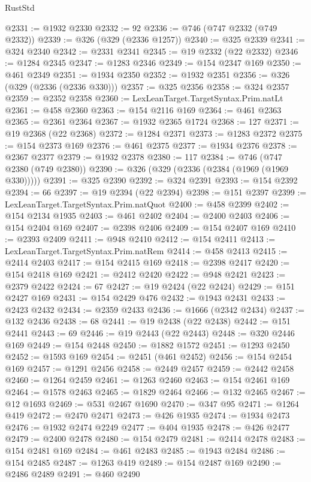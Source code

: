 \begin{lexlean}{RustStd}
\begin{coremodule}
@2331 := @1932 @2330
@2332 := 92
@2336 := @746 (@747 @2332 (@749 @2332))
@2339 := @326 (@329 (@2336 @1257))
@2340 := @325 @2339
@2341 := @324 @2340
@2342 := @2331 @2341
@2345 := @19 @2332 (@22 @2332)
@2346 := @1284 @2345
@2347 := @1283 @2346
@2349 := @154 @2347 @169
@2350 := @461 @2349
@2351 := @1934 @2350
@2352 := @1932 @2351
@2356 := @326 (@329 (@2336 (@2336 @330)))
@2357 := @325 @2356
@2358 := @324 @2357
@2359 := @2352 @2358
@2360 := LexLeanTarget.TargetSyntax.Prim.natLt
@2361 := @458 @2360
@2363 := @154 @2116 @169
@2364 := @461 @2363
@2365 := @2361 @2364
@2367 := @1932 @2365 @1724
@2368 := 127
@2371 := @19 @2368 (@22 @2368)
@2372 := @1284 @2371
@2373 := @1283 @2372
@2375 := @154 @2373 @169
@2376 := @461 @2375
@2377 := @1934 @2376
@2378 := @2367 @2377
@2379 := @1932 @2378
@2380 := 117
@2384 := @746 (@747 @2380 (@749 @2380))
@2390 := @326 (@329 (@2336 (@2384 (@1969 (@1969 @330)))))
@2391 := @325 @2390
@2392 := @324 @2391
@2393 := @154 @2392
@2394 := 66
@2397 := @19 @2394 (@22 @2394)
@2398 := @151 @2397
@2399 := LexLeanTarget.TargetSyntax.Prim.natQuot
@2400 := @458 @2399
@2402 := @154 @2134 @1935
@2403 := @461 @2402
@2404 := @2400 @2403
@2406 := @154 @2404 @169
@2407 := @2398 @2406
@2409 := @154 @2407 @169
@2410 := @2393 @2409
@2411 := @948 @2410
@2412 := @154 @2411
@2413 := LexLeanTarget.TargetSyntax.Prim.natRem
@2414 := @458 @2413
@2415 := @2414 @2403
@2417 := @154 @2415 @169
@2418 := @2398 @2417
@2420 := @154 @2418 @169
@2421 := @2412 @2420
@2422 := @948 @2421
@2423 := @2379 @2422
@2424 := 67
@2427 := @19 @2424 (@22 @2424)
@2429 := @151 @2427 @169
@2431 := @154 @2429 @476
@2432 := @1943 @2431
@2433 := @2423 @2432
@2434 := @2359 @2433
@2436 := @1666 (@2342 @2434)
@2437 := @132 @2436
@2438 := 68
@2441 := @19 @2438 (@22 @2438)
@2442 := @151 @2441
@2443 := 69
@2446 := @19 @2443 (@22 @2443)
@2448 := @320 @2446 @169
@2449 := @154 @2448
@2450 := @1882 @1572
@2451 := @1293 @2450
@2452 := @1593 @169
@2454 := @2451 (@461 @2452)
@2456 := @154 @2454 @169
@2457 := @1291 @2456
@2458 := @2449 @2457
@2459 := @2442 @2458
@2460 := @1264 @2459
@2461 := @1263 @2460
@2463 := @154 @2461 @169
@2464 := @1578 @2463
@2465 := @1829 @2464
@2466 := @132 @2465
@2467 := @12 @1693
@2469 := @531 @2467 @1690
@2470 := @347 @95
@2471 := @1264 @419
@2472 := @2470 @2471
@2473 := @426 @1935
@2474 := @1934 @2473
@2476 := @1932 @2474 @2249
@2477 := @404 @1935
@2478 := @426 @2477
@2479 := @2400 @2478
@2480 := @154 @2479
@2481 := @2414 @2478
@2483 := @154 @2481 @169
@2484 := @461 @2483
@2485 := @1943 @2484
@2486 := @154 @2485
@2487 := @1263 @419
@2489 := @154 @2487 @169
@2490 := @2486 @2489
@2491 := @460 @2490

\end{coremodule}
\end{lexlean}
